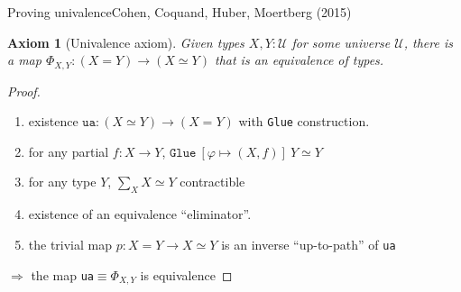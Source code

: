 \documentclass[english]{beamer}
\newtheorem{axiom}[theorem]{Axiom}
\begin{document}
\begin{frame}{Proving univalence}{Cohen, Coquand, Huber, Moertberg (2015)}

\begin{axiom}[Univalence axiom]
 Given types $X,Y : \mathcal{U}$ for some universe $\mathcal{U}$, there is a map  $\Phi_{X,Y}: (X=Y) \rightarrow (X \simeq Y)$ that is an equivalence of types. 
\end{axiom}


 

\begin{proof}

\begin{enumerate}

\item existence $\texttt{ua} : (X\simeq Y) \rightarrow (X = Y)$ with \texttt{Glue} construction.

\item for any partial $f : X \rightarrow Y$, $\texttt{Glue} \ [\varphi \mapsto (X, f)] \ Y \simeq Y$

\item for any type $Y$, $\sum_{X} X \simeq Y$ contractible

\item existence of an equivalence ``eliminator''.

\item the trivial map $p : X = Y \rightarrow X \simeq Y$ is an inverse ``up-to-path'' of \texttt{ua}
%  
%  
 
 \end{enumerate}
 
    $\Rightarrow$ the map \texttt{ua}$\equiv \Phi_{X,Y}$ is equivalence
\end{proof} 

\end{frame}
\end{document}
